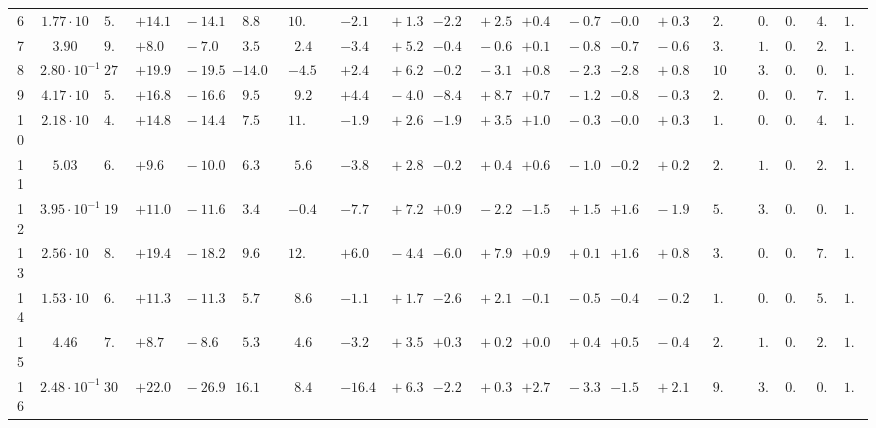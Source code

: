 \documentclass[12pt]{article}
\begin{document}
\begin{table}
\begin{tabular}{ccrr@{\hskip0pt}rrc@{\hskip0pt}r@{\hskip0pt}c@{\hskip0pt}r@{\hskip0pt}rr@{\hskip0pt}rr@{\hskip0pt}rr@{\hskip0pt}rr@{\hskip0pt}r@{\hskip0pt}r@{\hskip0pt}c|rr|r}
6 &$1.77 \cdot 10$ &$ 5.8$  & ${+14.1~}$&${~-14.1}$ & $ 8.8$  & &$10.0$&&${-2.1~}$&${~+1.3}$ & ${-2.2~}$&${~+2.5}$ & ${+0.4~}$&${~-0.7}$ & ${-0.0~}$&${~+0.3}$ & &$ 2.2$&&$ 0.6$  & $0.79$  & $ 4.7$  & $1.04$   \\ 
7 &$3.90$ &$ 9.1$  & ${+8.0~}$&${~-7.0}$ & $ 3.5$  & &$ 2.4$&&${-3.4~}$&${~+5.2}$ & ${-0.4~}$&${~-0.6}$ & ${+0.1~}$&${~-0.8}$ & ${-0.7~}$&${~-0.6}$ & &$ 3.0$&&$ 1.2$  & $0.84$  & $ 2.1$  & $1.03$   \\ 
8 &$2.80 \cdot 10^{-1}$ &$27.5$  & ${+19.9~}$&${~-19.5}$ & $-14.0$  & &$-4.5$&&${+2.4~}$&${~+6.2}$ & ${-0.2~}$&${~-3.1}$ & ${+0.8~}$&${~-2.3}$ & ${-2.8~}$&${~+0.8}$ & &$10.8$&&$ 3.9$  & $0.84$  & $ 0.7$  & $1.08$   \\ 
9 &$4.17 \cdot 10$ &$ 5.4$  & ${+16.8~}$&${~-16.6}$ & $ 9.5$  & &$ 9.2$&&${+4.4~}$&${~-4.0}$ & ${-8.4~}$&${~+8.7}$ & ${+0.7~}$&${~-1.2}$ & ${-0.8~}$&${~-0.3}$ & &$ 2.4$&&$ 0.5$  & $0.73$  & $ 7.3$  & $1.03$   \\ 
10 &$2.18 \cdot 10$ &$ 4.8$  & ${+14.8~}$&${~-14.4}$ & $ 7.5$  & &$11.5$&&${-1.9~}$&${~+2.6}$ & ${-1.9~}$&${~+3.5}$ & ${+1.0~}$&${~-0.3}$ & ${-0.0~}$&${~+0.3}$ & &$ 1.7$&&$ 0.6$  & $0.79$  & $ 4.7$  & $1.05$   \\ 
11 &$5.03$ &$ 6.9$  & ${+9.6~}$&${~-10.0}$ & $ 6.3$  & &$ 5.6$&&${-3.8~}$&${~+2.8}$ & ${-0.2~}$&${~+0.4}$ & ${+0.6~}$&${~-1.0}$ & ${-0.2~}$&${~+0.2}$ & &$ 2.1$&&$ 1.1$  & $0.84$  & $ 2.7$  & $1.04$   \\ 
12 &$3.95 \cdot 10^{-1}$ &$19.6$  & ${+11.0~}$&${~-11.6}$ & $ 3.4$  & &$-0.4$&&${-7.7~}$&${~+7.2}$ & ${+0.9~}$&${~-2.2}$ & ${-1.5~}$&${~+1.5}$ & ${+1.6~}$&${~-1.9}$ & &$ 5.8$&&$ 3.5$  & $0.86$  & $ 0.2$  & $1.03$   \\ 
13 &$2.56 \cdot 10$ &$ 8.2$  & ${+19.4~}$&${~-18.2}$ & $ 9.6$  & &$12.9$&&${+6.0~}$&${~-4.4}$ & ${-6.0~}$&${~+7.9}$ & ${+0.9~}$&${~+0.1}$ & ${+1.6~}$&${~+0.8}$ & &$ 3.0$&&$ 0.6$  & $0.73$  & $ 7.3$  & $1.04$   \\ 
14 &$1.53 \cdot 10$ &$ 6.2$  & ${+11.3~}$&${~-11.3}$ & $ 5.7$  & &$ 8.6$&&${-1.1~}$&${~+1.7}$ & ${-2.6~}$&${~+2.1}$ & ${-0.1~}$&${~-0.5}$ & ${-0.4~}$&${~-0.2}$ & &$ 1.9$&&$ 0.8$  & $0.79$  & $ 5.2$  & $1.04$   \\ 
15 &$4.46$ &$ 7.4$  & ${+8.7~}$&${~-8.6}$ & $ 5.3$  & &$ 4.6$&&${-3.2~}$&${~+3.5}$ & ${+0.3~}$&${~+0.2}$ & ${+0.0~}$&${~+0.4}$ & ${+0.5~}$&${~-0.4}$ & &$ 2.1$&&$ 1.3$  & $0.83$  & $ 2.8$  & $1.07$   \\ 
16 &$2.48 \cdot 10^{-1}$ &$30.1$  & ${+22.0~}$&${~-26.9}$ & $16.1$  & &$ 8.4$&&${-16.4~}$&${~+6.3}$ & ${-2.2~}$&${~+0.3}$ & ${+2.7~}$&${~-3.3}$ & ${-1.5~}$&${~+2.1}$ & &$ 9.3$&&$ 3.6$  & $0.86$  & $ 0.9$  & $1.03$   \\ 

\end{tabular}
\end{table}
\end{document}
